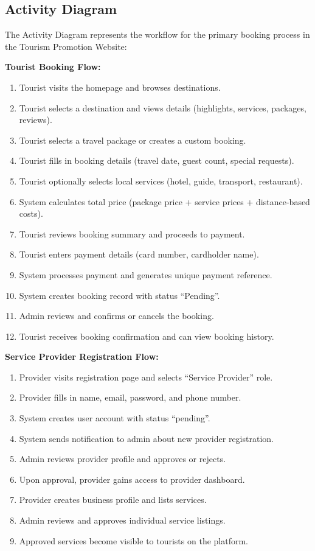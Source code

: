 \subsection{Activity Diagram}

The Activity Diagram represents the workflow for the primary booking process in the Tourism Promotion Website:

\textbf{Tourist Booking Flow:}
\begin{enumerate}[leftmargin=2em]
    \item Tourist visits the homepage and browses destinations.
    \item Tourist selects a destination and views details (highlights, services, packages, reviews).
    \item Tourist selects a travel package or creates a custom booking.
    \item Tourist fills in booking details (travel date, guest count, special requests).
    \item Tourist optionally selects local services (hotel, guide, transport, restaurant).
    \item System calculates total price (package price + service prices + distance-based costs).
    \item Tourist reviews booking summary and proceeds to payment.
    \item Tourist enters payment details (card number, cardholder name).
    \item System processes payment and generates unique payment reference.
    \item System creates booking record with status ``Pending''.
    \item Admin reviews and confirms or cancels the booking.
    \item Tourist receives booking confirmation and can view booking history.
\end{enumerate}

\textbf{Service Provider Registration Flow:}
\begin{enumerate}[leftmargin=2em]
    \item Provider visits registration page and selects ``Service Provider'' role.
    \item Provider fills in name, email, password, and phone number.
    \item System creates user account with status ``pending''.
    \item System sends notification to admin about new provider registration.
    \item Admin reviews provider profile and approves or rejects.
    \item Upon approval, provider gains access to provider dashboard.
    \item Provider creates business profile and lists services.
    \item Admin reviews and approves individual service listings.
    \item Approved services become visible to tourists on the platform.
\end{enumerate}

